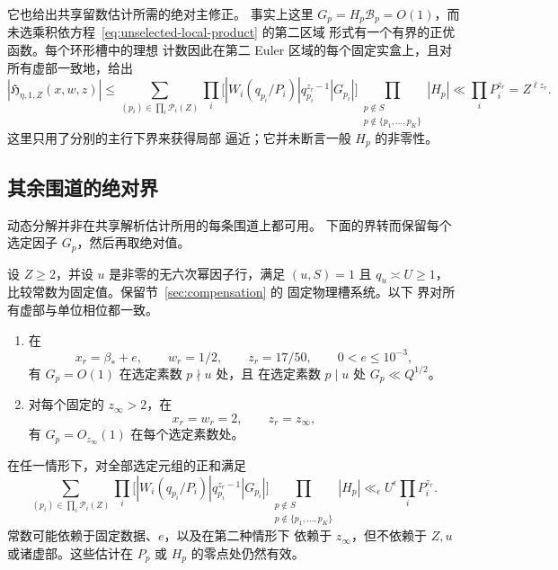 它也给出共享留数估计所需的绝对主修正。
事实上这里 $G_p=H_p\mathcal B_p=O(1)$，而
未选乘积依方程~\eqref{eq:unselected-local-product} 的第二区域
形式有一个有界的正优函数。每个环形槽中的理想
计数因此在第二 Euler 区域的每个固定实盒上，且对所有虚部一致地，给出
\begin{equation}\label{eq:principal-local-tuple-bound}
 |\mathfrak H_{\eta,1,Z}(x,w,z)|
 \le\sum_{(p_i)\in\prod_i\mathcal P_i(Z)}
       \prod_i\bigl[|W_i(q_{p_i}/P_i)|q_{p_i}^{z_r-1}|G_{p_i}|\bigr]
       \prod_{\substack{p\notin S\\p\notin\{p_1,\ldots,p_K\}}}|H_p|
 \ll \prod_iP_i^{z_r}=Z^{\ell z_r}.
\end{equation}
这里只用了分别的主行下界来获得局部
逼近；它并未断言一般 $H_p$ 的非零性。

\subsection{其余围道的绝对界}

动态分解并非在共享解析估计所用的每条围道上都可用。
下面的界转而保留每个
选定因子 $G_p$，然后再取绝对值。

\begin{lemma}[绝对局部元组界]
\label{lem:compensated-absolute-local-bounds}
设 $Z\ge2$，并设 $u$ 是非零的无六次幂因子行，满足 $(u,S)=1$ 且
$q_u\asymp U\ge1$，比较常数为固定值。保留节~\ref{sec:compensation} 的
固定物理槽系统。以下
界对所有虚部与单位相位都一致。
\begin{enumerate}
\item 在
\[
 x_r=\beta_*+e,\qquad w_r=1/2,\qquad z_r=17/50,
 \qquad 0<e\le10^{-3},
\]
有 $G_p=O(1)$ 在选定素数 $p\nmid u$ 处，且
在选定素数 $p\mid u$ 处 $G_p\ll Q^{1/2}$。
\item 对每个固定的 $z_\infty>2$，在
\[
 x_r=w_r=2,\qquad z_r=z_\infty,
\]
有 $G_p=O_{z_\infty}(1)$ 在每个选定素数处。
\end{enumerate}
在任一情形下，对全部选定元组的正和满足
\begin{equation}\label{eq:absolute-local-tuple-bound}
 \sum_{(p_i)\in\prod_i\mathcal P_i(Z)}
       \prod_i\bigl[|W_i(q_{p_i}/P_i)|q_{p_i}^{z_r-1}|G_{p_i}|\bigr]
       \prod_{\substack{p\notin S\\p\notin\{p_1,\ldots,p_K\}}}|H_p|
 \ll_\epsilon U^\epsilon\prod_iP_i^{z_r}.
\end{equation}
常数可能依赖于固定数据、$e$，以及在第二种情形下
依赖于 $z_\infty$，但不依赖于 $Z,u$ 或诸虚部。这些估计在
$P_p$ 或 $H_p$ 的零点处仍然有效。
\end{lemma}

